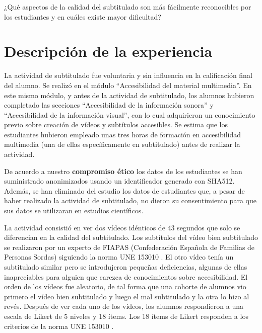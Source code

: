 \documentclass[
  12pt,
  a4paper,
  extrafontsizes,
  onecolumn,
  openright,
  table]{memoir}
\begin{document}
\begin{tcolorbox}[enhanced jigsaw, opacitybacktitle=0.6, rightrule=.15mm, bottomtitle=1mm, opacityback=0, bottomrule=.15mm, arc=.35mm, colback=white, titlerule=0mm, colbacktitle=quarto-callout-tip-color!10!white, toptitle=1mm, coltitle=black, leftrule=.75mm, breakable, title=\textcolor{quarto-callout-tip-color}{\faLightbulb}\hspace{0.5em}{Objetivos específicos}, toprule=.15mm, colframe=quarto-callout-tip-color-frame, left=2mm]

¿Qué aspectos de la calidad del subtitulado son más fácilmente
reconocibles por los estudiantes y en cuáles existe mayor dificultad?

\end{tcolorbox}

\hypertarget{descripciuxf3n-de-la-experiencia}{%
\section{Descripción de la
experiencia}\label{descripciuxf3n-de-la-experiencia}}

La actividad de subtitulado fue voluntaria y sin influencia en la
calificación final del alumno. Se realizó en el módulo
\enquote{Accesibilidad del material multimedia}. En este mismo módulo, y
antes de la actividad de subtitulado, los alumnos hubieron completado
las secciones \enquote{Accesibilidad de la información sonora} y
\enquote{Accesibilidad de la información visual}, con lo cual
adquirieron un conocimiento previo sobre creación de vídeos y subtítulos
accesibles. Se estima que los estudiantes hubieron empleado unas tres
horas de formación en accesibilidad multimedia (una de ellas
específicamente en subtitulado) antes de realizar la actividad.

De acuerdo a nuestro \textbf{compromiso ético} los datos de los
estudiantes se han suministrado anonimizados usando un identificador
generado con SHA512. Además, se han eliminado del estudio los datos de
estudiantes que, a pesar de haber realizado la actividad de subtitulado,
no dieron su consentimiento para que sus datos se utilizaran en estudios
científicos.

La actividad consistió en ver dos vídeos idénticos de 43 segundos que
solo se diferencian en la calidad del subtitulado. Los subtítulos del
vídeo bien subtitulado se realizaron por un experto de FIAPAS
(Confederación Española de Familias de Personas Sordas) siguiendo la
norma UNE 153010 \autocite[ver][]{aenor2012}. El otro vídeo tenía un
subtitulado similar pero se introdujeron pequeñas deficiencias, algunas
de ellas inapreciables para alguien que carezca de conocimientos sobre
accesibilidad. El orden de los vídeos fue aleatorio, de tal forma que
una cohorte de alumnos vio primero el vídeo bien subtitulado y luego el
mal subtitulado y la otra lo hizo al revés. Después de ver cada uno de
los vídeos, los alumnos respondieron a una escala de Likert de 5 niveles
y 18 ítems. Los 18 ítems de Likert responden a los criterios de la norma
UNE 153010 \autocite[ver][]{aenor2012}.
\end{document}
